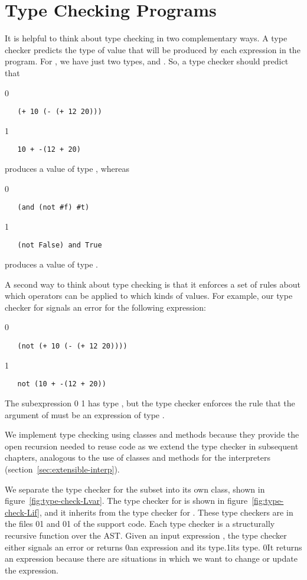 \documentclass[7x10]{TimesAPriori_MIT}%
\def\racketEd{0}
\def\pythonEd{1}
\def\edition{1}
\newcommand{\racket}[1]{{\if\edition\racketEd{#1}\fi}}
\newcommand{\pythonColor}[0]{}
\newcommand{\python}[1]{{\if\edition\pythonEd\pythonColor #1\fi}}
\numberwithin{theorem}{chapter}
\numberwithin{definition}{chapter}
\numberwithin{equation}{chapter}
\begin{document}
\section{Type Checking \LangIf{} Programs}
\label{sec:type-check-Lif}

It is helpful to think about type checking in two complementary ways. A type checker predicts the
type of value that will be produced by each expression in the program.
For \LangIf{}, we have just two types, \INTTY{} and \BOOLTY{}. So, a
type checker should predict that {\if\edition\racketEd
\begin{lstlisting}
   (+ 10 (- (+ 12 20)))
\end{lstlisting}
\fi}
{\if\edition\pythonEd\pythonColor
\begin{lstlisting}
   10 + -(12 + 20)
\end{lstlisting}
\fi}
\noindent produces a value of type \INTTY{}, whereas
{\if\edition\racketEd
\begin{lstlisting}
   (and (not #f) #t)
\end{lstlisting}
\fi}
{\if\edition\pythonEd\pythonColor
\begin{lstlisting}
   (not False) and True
\end{lstlisting}
\fi}
\noindent produces a value of type \BOOLTY{}.

A second way to think about type checking is that it enforces a set of
rules about which operators can be applied to which kinds of
values. For example, our type checker for \LangIf{} signals an error
for the following expression:
%
{\if\edition\racketEd
\begin{lstlisting}
   (not (+ 10 (- (+ 12 20))))
\end{lstlisting}
\fi}
{\if\edition\pythonEd\pythonColor
\begin{lstlisting}
   not (10 + -(12 + 20))
\end{lstlisting}
\fi}
\noindent The subexpression
\racket{}
\python{}
has type \INTTY{}, but the type checker enforces the rule that the
argument of  must be an expression of type \BOOLTY{}.

We implement type checking using classes and methods because they
provide the open recursion needed to reuse code as we extend the type
checker in subsequent chapters, analogous to the use of classes and methods
for the interpreters (section~\ref{sec:extensible-interp}).

We separate the type checker for the \LangVar{} subset into its own
class, shown in figure~\ref{fig:type-check-Lvar}. The type checker for
\LangIf{} is shown in figure~\ref{fig:type-check-Lif}, and it inherits
from the type checker for \LangVar{}. These type checkers are in the
files
\racket{}\python{}
and
\racket{}\python{}
of the support code.
%
Each type checker is a structurally recursive function over the AST.
Given an input expression , the type checker either signals an
error or returns \racket{an expression and its type.}\python{its type.}
%
\racket{It returns an expression because there are situations in which
  we want to change or update the expression.}
\end{document}
